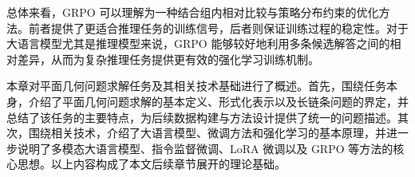总体来看，GRPO 可以理解为一种结合组内相对比较与策略分布约束的优化方法。前者提供了更适合推理任务的训练信号，后者则保证训练过程的稳定性。对于大语言模型尤其是推理模型来说，GRPO 能够较好地利用多条候选解答之间的相对差异，从而为复杂推理任务提供更有效的强化学习训练机制。


本章对平面几何问题求解任务及其相关技术基础进行了概述。首先，围绕任务本身，介绍了平面几何问题求解的基本定义、形式化表示以及长链条问题的界定，并总结了该任务的主要特点，为后续数据构建与方法设计提供了统一的问题描述。其次，围绕相关技术，介绍了大语言模型、微调方法和强化学习的基本原理，并进一步说明了多模态大语言模型、指令监督微调、LoRA 微调以及 GRPO 等方法的核心思想。以上内容构成了本文后续章节展开的理论基础。